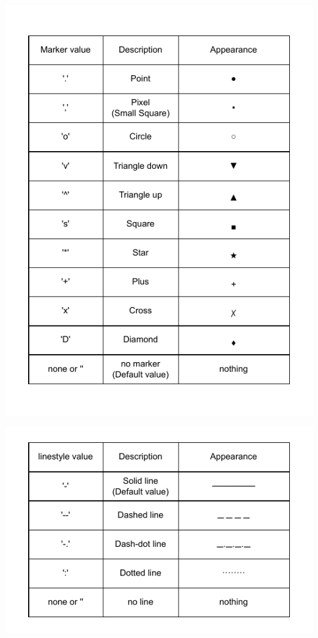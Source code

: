 \newpage

\begin{center}
    \includegraphics[height=0.6\textheight]{Chapters/PDF/marker.drawio.pdf}
\end{center}

\begin{center}
    \includegraphics[height=0.35\textheight]{Chapters/PDF/linestyle.drawio.pdf}
\end{center}

